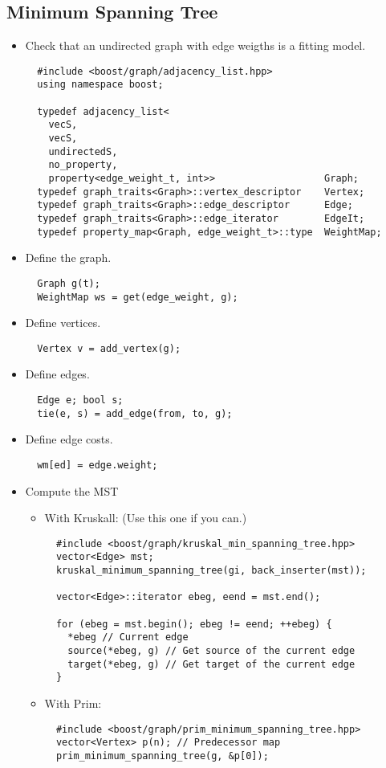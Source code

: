 \documentclass[guide.tex]{subfiles}
\begin{document}
\subsection{Minimum Spanning Tree}
\begin{itemize}
  \item Check that an undirected graph with edge weigths is a fitting model.

\begin{verbatim}
  #include <boost/graph/adjacency_list.hpp>
  using namespace boost;

  typedef adjacency_list<
    vecS,
    vecS,
    undirectedS,
    no_property,
    property<edge_weight_t, int>>                   Graph;
  typedef graph_traits<Graph>::vertex_descriptor    Vertex;
  typedef graph_traits<Graph>::edge_descriptor      Edge;
  typedef graph_traits<Graph>::edge_iterator        EdgeIt;
  typedef property_map<Graph, edge_weight_t>::type  WeightMap;
\end{verbatim}
  \item Define the graph.
\begin{verbatim}
  Graph g(t);
  WeightMap ws = get(edge_weight, g);
\end{verbatim}
  \item Define vertices.
\begin{verbatim}
  Vertex v = add_vertex(g);
\end{verbatim}
  \item Define edges.
\begin{verbatim}
  Edge e; bool s;
  tie(e, s) = add_edge(from, to, g);
\end{verbatim}
  \item Define edge costs.
\begin{verbatim}
  wm[ed] = edge.weight;
\end{verbatim}
  \item Compute the MST
  \begin{itemize}
    \item With Kruskall: (Use this one if you can.)
\begin{verbatim}
  #include <boost/graph/kruskal_min_spanning_tree.hpp>
  vector<Edge> mst;
  kruskal_minimum_spanning_tree(gi, back_inserter(mst));

  vector<Edge>::iterator ebeg, eend = mst.end();

  for (ebeg = mst.begin(); ebeg != eend; ++ebeg) {
    *ebeg // Current edge
    source(*ebeg, g) // Get source of the current edge
    target(*ebeg, g) // Get target of the current edge
  }
\end{verbatim}
    \item With Prim:
\begin{verbatim}
  #include <boost/graph/prim_minimum_spanning_tree.hpp>
  vector<Vertex> p(n); // Predecessor map
  prim_minimum_spanning_tree(g, &p[0]);


\end{verbatim}
\end{itemize}
\end{itemize}
\end{document}
